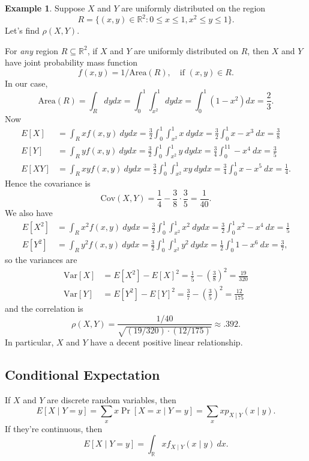 \documentclass[12pt]{article}
\theoremstyle{plain}
\theoremstyle{definition}
\newtheorem{example}[theorem]{Example}
\theoremstyle{remark}
\newcommand{\Var}{\ensuremath{\textrm{Var}}}
\newcommand{\Cov}{\ensuremath{\textrm{Cov}}}
\newcommand{\R}{\mathbb{R}}
\begin{document}
\begin{example}
Suppose $X$ and $Y$ are uniformly distributed on the region
\[
    R = \{(x,y)\in \R^2: 0\leq x \leq 1, x^2 \leq  y \leq 1\}.
\]
Let's find $\rho(X,Y)$.

For \emph{any} region $R\subseteq \R^2$, if $X$ and $Y$ are uniformly distributed on $R$, then $X$ and $Y$ have joint probability mass function
\[
    f(x,y) = 1/\text{Area}(R),\quad\text{if }(x,y)\in R.
\]
In our case,
\[
    \text{Area}(R) = \int_R dydx = \int_0^1\int_{x^2}^1dydx = \int_0^1(1-x^2)dx = \frac{2}{3}.
\]
Now
\begin{align*}
    E[X] &= \int_R x f(x,y)\ dydx = \frac{3}{2}\int_0^1\int_{x^2}^1x\ dydx = \frac{3}{2}\int_0^1x - x^3\ dx= \frac{3}{8}\\
    E[Y] &= \int_R y f(x,y)\ dydx = \frac{3}{2}\int_0^1\int_{x^2}^1y\ dydx = \frac{3}{4}\int_0^11 - x^4\ dx= \frac{3}{5}\\
    E[XY] &= \int_R xyf(x,y)\ dydx = \frac{3}{2}\int_0^1\int_{x^2}^1xy\ dydx = \frac{3}{4}\int_0^1x - x^5\ dx = \frac{1}{4}.
\end{align*}
Hence the covariance is
\[
    \Cov(X,Y) = \frac{1}{4} - \frac{3}{8}\cdot \frac{3}{5} = \frac{1}{40}.
\]
We also have
\begin{align*}
    E[X^2] &= \int_R x^2 f(x,y)\ dydx = \frac{3}{2}\int_0^1\int_{x^2}^1x^2\ dydx = \frac{3}{2}\int_0^1x^2 - x^4\ dx = \frac{1}{5}\\
    E[Y^2] &= \int_R y^2 f(x,y)\ dydx = \frac{3}{2}\int_0^1\int_{x^2}^1y^2\ dydx = \frac{1}{2}\int_0^1 1 - x^6\ dx = \frac{3}{7},
\end{align*}
so the variances are
\begin{align*}
    \Var[X] &= E[X^2] - E[X]^2 = \frac{1}{5} - \left(\frac{3}{8}\right)^2 = \frac{19}{320}\\
    \Var[Y] &= E[Y^2] - E[Y]^2 = \frac{3}{7} - \left(\frac{3}{5}\right)^2 = \frac{12}{175}
\end{align*}
and the correlation is
\[
    \rho(X,Y) = \frac{1/40}{\sqrt{(19/320)\cdot (12/175)}} \approx .392.
\]
In particular, $X$ and $Y$ have a decent positive linear relationship.
\end{example}










\subsection{Conditional Expectation}
If $X$ and $Y$ are discrete random variables, then
\[
E[X\mid Y = y] = \sum _x x \Pr[X = x\mid Y = y] = \sum_x x p_{X\mid Y}(x\mid y).
\]
If they're continuous, then
\[
    E[X\mid Y = y] = \int_\R xf_{X\mid Y}(x\mid y)\ dx.
\]
\end{document}
